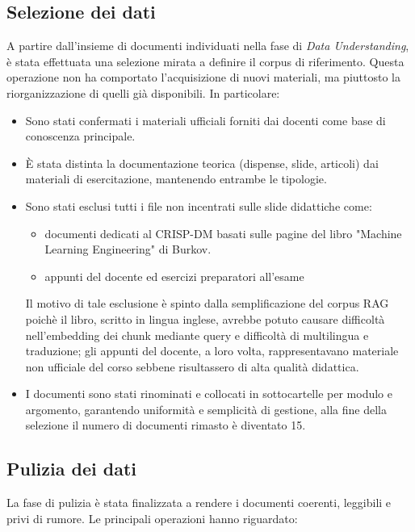 \documentclass[a4paper,9pt]{article}
\begin{document}
\subsection{Selezione dei dati}
A partire dall’insieme di documenti individuati nella fase di \textit{Data Understanding}, è stata effettuata una selezione mirata a definire il corpus di riferimento.  
Questa operazione non ha comportato l’acquisizione di nuovi materiali, ma piuttosto la riorganizzazione di quelli già disponibili.  
In particolare:
\begin{itemize}
	\item Sono stati confermati i materiali ufficiali forniti dai docenti come base di conoscenza principale.
	\item È stata distinta la documentazione teorica (dispense, slide, articoli) dai materiali di esercitazione, mantenendo entrambe le tipologie.
	\item Sono stati esclusi tutti i file non incentrati sulle slide didattiche come:
	\begin{itemize}
		\item documenti dedicati al CRISP-DM basati sulle pagine del libro "Machine Learning Engineering" di Burkov.
		\item appunti del docente ed esercizi preparatori all'esame
	\end{itemize}
	Il motivo di tale esclusione è spinto dalla semplificazione del corpus RAG poichè il libro, scritto in lingua inglese, avrebbe potuto causare difficoltà nell'embedding dei chunk mediante query e difficoltà di multilingua e traduzione; gli appunti del docente, a loro volta, rappresentavano materiale non ufficiale del corso sebbene risultassero di alta qualità didattica.
	\item I documenti sono stati rinominati e collocati in sottocartelle per modulo e argomento, garantendo uniformità e semplicità di gestione, alla fine della selezione il numero di documenti rimasto è diventato 15.
\end{itemize}

\subsection{Pulizia dei dati}
La fase di pulizia è stata finalizzata a rendere i documenti coerenti, leggibili e privi di rumore. Le principali operazioni hanno riguardato:
\end{document}
